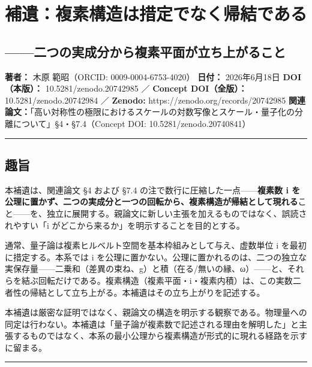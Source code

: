 \documentclass[11pt]{ltjsarticle}
\begin{document}
\section{補遺：複素構造は措定でなく帰結である}\label{ux88dcux907aux8907ux7d20ux69cbux9020ux306fux63aaux5b9aux3067ux306aux304fux5e30ux7d50ux3067ux3042ux308b}

\subsection{------二つの実成分から複素平面が立ち上がること}\label{ux4e8cux3064ux306eux5b9fux6210ux5206ux304bux3089ux8907ux7d20ux5e73ux9762ux304cux7acbux3061ux4e0aux304cux308bux3053ux3068}

\textbf{著者：} 木原 範昭（ORCID: 0009-0004-6753-4020） \textbf{日付：}
2026年6月18日 \textbf{DOI（本版）：} 10.5281/zenodo.20742985 ／
\textbf{Concept DOI（全版）：} 10.5281/zenodo.20742984 ／
\textbf{Zenodo:} https://zenodo.org/records/20742985
\textbf{関連論文：}「高い対称性の極限におけるスケールの対数写像とスケール・量子化の分離について」§4・§7.4（Concept
DOI: 10.5281/zenodo.20740841）

\begin{center}\rule{0.5\linewidth}{0.5pt}\end{center}

\subsection{趣旨}\label{ux8da3ux65e8}

本補遺は、関連論文 §4 および §7.4
の注で数行に圧縮した一点------\textbf{複素数 i
を公理に置かず、二つの実成分と一つの回転から、複素構造が帰結として現れる}こと------を、独立に展開する。親論文に新しい主張を加えるものではなく、誤読されやすい「i
がどこから来るか」を明示することを目的とする。

通常、量子論は複素ヒルベルト空間を基本枠組みとして与え、虚数単位 i
を最初に措定する。本系では i
を公理に置かない。公理に置かれるのは、二つの独立な実保存量------二乗和（差異の束ね、g）と積（在る/無いの縁、ω）------と、それらを結ぶ回転だけである。複素構造（複素平面・i・複素内積）は、この実数二者性の帰結として立ち上がる。本補遺はその立ち上がりを記述する。

本補遺は厳密な証明ではなく、親論文の構造を明示する観察である。物理量への同定は行わない。本補遺は「量子論が複素数で記述される理由を解明した」と主張するものではなく、本系の最小公理から複素構造が形式的に現れる経路を示すに留まる。

\begin{center}\rule{0.5\linewidth}{0.5pt}\end{center}
\end{document}
